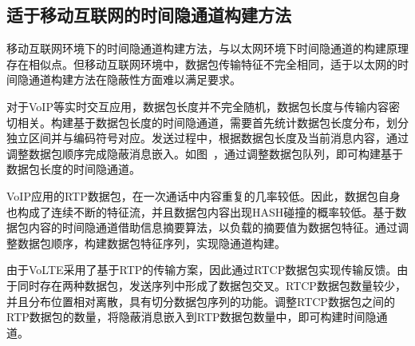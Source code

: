 \subsection{适于移动互联网的时间隐通道构建方法}
\label{chap:backinfo:ctc:mobile}
移动互联网环境下的时间隐通道构建方法，与以太网环境下时间隐通道的构建原理存在相似点。但移动互联网环境中，数据包传输特征不完全相同，适于以太网的时间隐通道构建方法在隐蔽性方面难以满足要求。


对于VoIP等实时交互应用，数据包长度并不完全随机，数据包长度与传输内容密切相关。构建基于数据包长度的时间隐通道，需要首先统计数据包长度分布，划分独立区间并与编码符号对应。发送过程中，根据数据包长度及当前消息内容，通过调整数据包顺序完成隐蔽消息嵌入。如图\ ，通过调整数据包队列，即可构建基于数据包长度的时间隐通道。

VoIP应用的RTP数据包，在一次通话中内容重复的几率较低。因此，数据包自身也构成了连续不断的特征流，并且数据包内容出现HASH碰撞的概率较低。基于数据包内容的时间隐通道借助信息摘要算法，以负载的摘要值为数据包特征。通过调整数据包顺序，构建数据包特征序列，实现隐通道构建。

由于VoLTE采用了基于RTP的传输方案，因此通过RTCP数据包实现传输反馈。由于同时存在两种数据包，发送序列中形成了数据包交叉。RTCP数据包数量较少，并且分布位置相对离散，具有切分数据包序列的功能。调整RTCP数据包之间的RTP数据包的数量，将隐蔽消息嵌入到RTP数据包数量中，即可构建时间隐通道。


